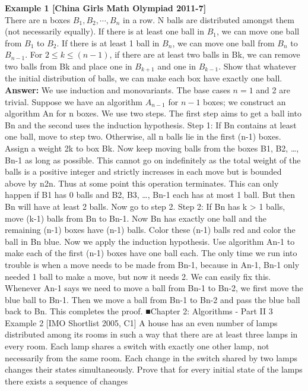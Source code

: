 \documentclass[a4paper,11pt]{book}
\begin{document}
\textbf{ Example 1 [China Girls Math Olympiad 2011-7]}\\
There are n boxes $B_1, B_2, \cdots, B_n$ in a row. N balls are distributed
amongst them (not necessarily equally). If there is at least one ball
in $B_1$, we can move one ball from $B_1$ to $B_2$. If there is at least 1 ball
in $B_n$, we can move one ball from $B_n$ to $B_{n-1}$. For $2 \le k \le (n -1)$, if
there are at least two balls in Bk, we can remove two balls from Bk
and place one in $B_{k+1}$ and one in $B_{k-1}$. Show that whatever the
initial distribution of balls, we can make each box have exactly one
ball.\\
\textbf{ Answer:}
We use induction and monovariants. The base cases $n =1$ and 2
are trivial. Suppose we have an algorithm $A_{n-1}$ for $n-1$ boxes; we
construct an algorithm An for n boxes. We use two steps. The first
step aims to get a ball into Bn and the second uses the induction
hypothesis.
Step 1: If Bn contains at least one ball, move to step two.
Otherwise, all n balls lie in the first (n-1) boxes. Assign a weight 2k
to box Bk. Now keep moving balls from the boxes B1, B2, …, Bn-1 as
long as possible. This cannot go on indefinitely as the total weight
of the balls is a positive integer and strictly increases in each move
but is bounded above by n2n. Thus at some point this operation
terminates. This can only happen if B1 has 0 balls and B2, B3, …, Bn-1
each has at most 1 ball. But then Bn will have at least 2 balls. Now
go to step 2.
Step 2: If Bn has k > 1 balls, move (k-1) balls from Bn to Bn-1. Now
Bn has exactly one ball and the remaining (n-1) boxes have (n-1)
balls. Color these (n-1) balls red and color the ball in Bn blue. Now
we apply the induction hypothesis. Use algorithm An-1 to make
each of the first (n-1) boxes have one ball each. The only time we
run into trouble is when a move needs to be made from Bn-1,
because in An-1, Bn-1 only needed 1 ball to make a move, but now it
needs 2. We can easily fix this. Whenever An-1 says we need to
move a ball from Bn-1 to Bn-2, we first move the blue ball to Bn-1.
Then we move a ball from Bn-1 to Bn-2 and pass the blue ball back to
Bn. This completes the proof. ■Chapter 2: Algorithms - Part II 3
Example 2 [IMO Shortlist 2005, C1]
A house has an even number of lamps distributed among its
rooms in such a way that there are at least three lamps in every
room. Each lamp shares a switch with exactly one other lamp, not
necessarily from the same room. Each change in the switch shared
by two lamps changes their states simultaneously. Prove that for
every initial state of the lamps there exists a sequence of changes
\end{document}

